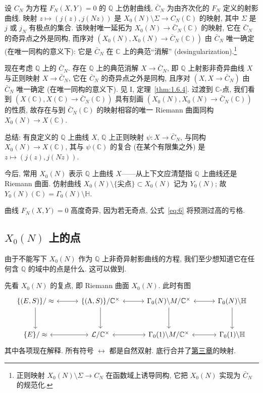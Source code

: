 设 $C_N$ 为方程 $F_N(X, Y) = 0$ 的 $\mathbb{Q}$ 上仿射曲线, $\bar{C}_N$ 为由齐次化的 $F_N$ 定义的射影曲线. 映射 $z\mapsto(j(z), j(Nz))$ 是 $X_0(N)\setminus\Sigma\to C_N(\mathbb{C})$ 的映射, 其中 $\Sigma$ 是 $j$ 或 $j_N$ 有极点的集合. 该映射唯一延拓为 $X_0(N)\to\bar{C}_N(\mathbb{C})$ 的映射, 它在 $\bar{C}_N$ 的奇异点之外是同构, 而序对 $(X_0(N), X_0(N)\to\bar{C}_N(\mathbb{C}))$ 由 $\bar{C}_N$ 唯一确定 (在唯一同构的意义下): 它是 $\bar{C}_N$ 在 $\mathbb{C}$ 上的典范``消解'' (desingularization).\footnote{正则映射 $X_0(N)\setminus\Sigma\to C_N$ 在函数域上诱导同构, 它把 $X_0(N)$ 实现为 $\bar{C}_N$ 的规范化.}

现在考虑 $\mathbb{Q}$ 上的 $\bar{C}_N$. 存在 $\mathbb{Q}$ 上的典范消解 $X\to\bar{C}_N$, 即 $\mathbb{Q}$ 上射影非奇异曲线 $X$ 与正则映射 $X\to\bar{C}_N$, 它在 $\bar{C}_N$ 的奇异点之外是同构, 且序对 $(X, X\to\bar{C}_N)$ 由 $\bar{C}_N$ 唯一确定 (在唯一同构的意义下). 见 I, 定理~\ref{thm:1.6.4}. 过渡到 $\mathbb{C}$-点, 我们看到 $(X(\mathbb{C}), X(\mathbb{C})\to\bar{C}_N(\mathbb{C}))$ 具有刻画 $(X_0(N), X_0(N)\to\bar{C}_N(\mathbb{C}))$ 的性质, 故存在与到 $\bar{C}_N(\mathbb{C})$ 的映射相容的唯一 Riemann 曲面同构 $X_0(N)\to X(\mathbb{C})$.

总结: 有良定义的 $\mathbb{Q}$ 上曲线 $X$, $\mathbb{Q}$ 上正则映射 $\psi\colon X\to\bar{C}_N$, 与同构 $X_0(N)\to X(\mathbb{C})$, 其与 $\psi(\mathbb{C})$ 的复合 (在某个有限集之外) 是 $z\mapsto(j(z), j(Nz))$.

今后, 常用 $X_0(N)$ 表示 $\mathbb{Q}$ 上曲线 $X$——从上下文应清楚指 $\mathbb{Q}$ 上曲线还是 Riemann 曲面. 仿射曲线 $X_0(N)\setminus\{\text{尖点}\}\subset X_0(N)$ 记为 $Y_0(N)$; 故 $Y_0(N)(\mathbb{C}) = \Gamma_0(N)\setminus\mathbb{H}$.

\begin{remark} \label{thm:5.2.6} 
曲线 $F_N(X, Y) = 0$ 高度奇异, 因为若无奇点, 公式~\eqref{eq:6} 将预测过高的亏格.
\end{remark}

\subsection*{$X_0(N)$ 上的点}

由于不能写下 $X_0(N)$ 作为 $\mathbb{Q}$ 上非奇异射影曲线的方程, 我们至少想知道它在任何含 $\mathbb{Q}$ 的域中的点是什么. 这可以做到.

先看 $X_0(N)$ 的复点, 即 Riemann 曲面 $X_0(N)$. 此时有图
\[
\begin{tikzcd}[row sep=3em, column sep=3em]
    \{(E,S)\}/\approx \arrow[d] \arrow[r, leftrightarrow] & 
    \{(\Lambda,S)\}/\mathbb{C}^\times \arrow[d] \arrow[r, leftrightarrow] & 
    \Gamma_0(N)\backslash M/\mathbb{C}^\times \arrow[d] \arrow[r, leftrightarrow] & 
    \Gamma_0(N)\backslash \mathbb{H} \arrow[d] \\
    \{E\}/\approx \arrow[r, leftrightarrow] & 
    \mathcal{L}/\mathbb{C}^\times \arrow[r, leftrightarrow] & 
    \Gamma_0(1)\backslash M/\mathbb{C}^\times \arrow[r, leftrightarrow] & 
    \Gamma_0(1)\backslash \mathbb{H}
\end{tikzcd}
\]
其中各项现在解释. 所有符号 $\longleftrightarrow$ 都是自然双射. 底行合并了\hyperref[ch:3]{第三章}的映射.

